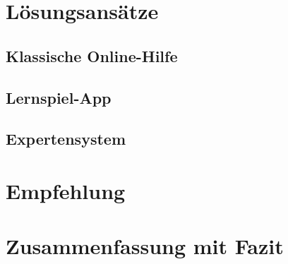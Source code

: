 
\chapter{Lösungsansätze}

\section{Klassische Online-Hilfe}

\section{Lernspiel-App}

\section{Expertensystem}
\label{ch:Content2}



\chapter{Empfehlung}

\chapter{Zusammenfassung mit Fazit}


